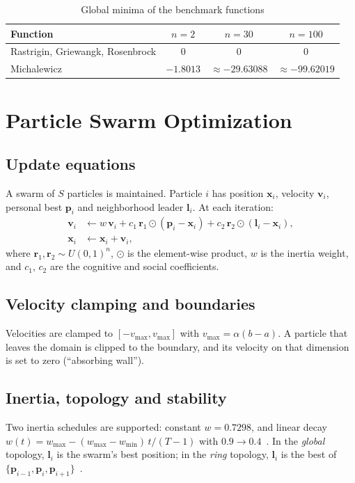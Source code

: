 \documentclass[conference]{IEEEtran}
\begin{document}
\begin{table}[t]
\centering
\caption{Global minima of the benchmark functions}
\label{tab:optima}
\begin{tabular}{lccc}
\toprule
Function & $n=2$ & $n=30$ & $n=100$\\
\midrule
Rastrigin, Griewangk, Rosenbrock & 0 & 0 & 0\\
Michalewicz & $-1.8013$ & $\approx-29.63088$ & $\approx-99.62019$\\
\bottomrule
\end{tabular}
\end{table}

\section{Particle Swarm Optimization}\label{sec:pso}
\subsection{Update equations}
A swarm of $S$ particles is maintained. Particle $i$ has position
$\mathbf{x}_i$, velocity $\mathbf{v}_i$, personal best $\mathbf{p}_i$ and
neighborhood leader $\mathbf{l}_i$. At each iteration:
\begin{align}
\mathbf{v}_i &\leftarrow w\,\mathbf{v}_i
 + c_1\,\mathbf{r}_1\odot(\mathbf{p}_i-\mathbf{x}_i)
 + c_2\,\mathbf{r}_2\odot(\mathbf{l}_i-\mathbf{x}_i),\label{eq:v}\\
\mathbf{x}_i &\leftarrow \mathbf{x}_i+\mathbf{v}_i,\label{eq:x}
\end{align}
where $\mathbf{r}_1,\mathbf{r}_2\sim U(0,1)^n$, $\odot$ is the
element-wise product, $w$ is the inertia weight, and $c_1$, $c_2$ are the
cognitive and social coefficients.

\subsection{Velocity clamping and boundaries}
Velocities are clamped to $[-v_{\max},v_{\max}]$ with
$v_{\max}=\alpha(b-a)$. A particle that leaves the domain is clipped to the
boundary, and its velocity on that dimension is set to zero (``absorbing
wall'').

\subsection{Inertia, topology and stability}
Two inertia schedules are supported: constant $w=0.7298$, and linear decay
$w(t)=w_{\max}-(w_{\max}-w_{\min})\,t/(T-1)$ with
$0.9\to0.4$~\cite{shi1998,shi1999}. In the \emph{global} topology,
$\mathbf{l}_i$ is the swarm's best position; in the \emph{ring} topology,
$\mathbf{l}_i$ is the best of
$\{\mathbf{p}_{i-1},\mathbf{p}_i,\mathbf{p}_{i+1}\}$~\cite{kennedy2002,mendes2004}.
\end{document}
